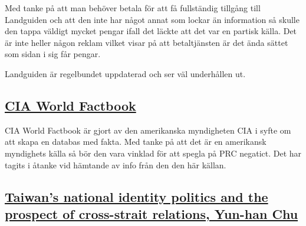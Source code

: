 \documentclass[a4paper,10pt]{article}
\begin{document}
Med tanke på att man behöver betala för att få fullständig tillgång till Landguiden och att den inte har något annat som lockar än information så skulle den tappa väldigt mycket pengar ifall det läckte att det var en partisk källa. Det är inte heller någon reklam vilket visar på att betaltjänsten är det ända sättet som sidan i sig får pengar.

Landguiden är regelbundet uppdaterad och ser väl underhållen ut.
\subsection*{\href{https://www.cia.gov/library/publications/the-world-factbook/geos/tw.html}{CIA World Factbook}}
CIA World Factbook är gjort av den amerikanska myndigheten CIA i syfte om att skapa en databas med fakta. Med tanke på att det är en amerikansk myndighets källa så bör den vara vinklad för att spegla på PRC negatict. Det har tagits i åtanke vid hämtande av info från den den här källan.

\subsection*{\href{http://isites.harvard.edu/fs/docs/icb.topic199080.files/Readings_for_October_23_/Chu.AS.04.pdf}{Taiwan’s national identity politics and the prospect of cross-strait relations, Yun-han Chu}}

%
%
%
%
%
%
%
%
%
%
%
%
%
\end{document}
